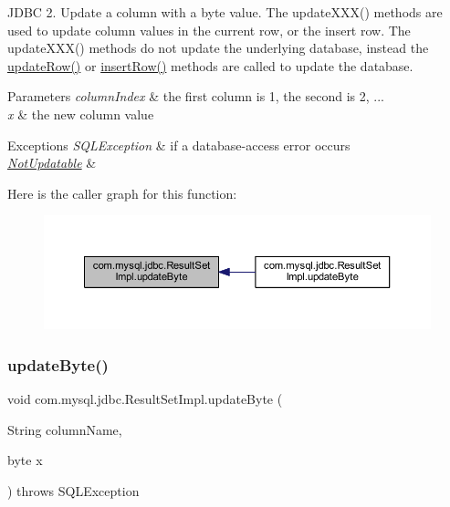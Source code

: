 J\+D\+BC 2. Update a column with a byte value. The update\+X\+X\+X() methods are used to update column values in the current row, or the insert row. The update\+X\+X\+X() methods do not update the underlying database, instead the \mbox{\hyperlink{classcom_1_1mysql_1_1jdbc_1_1_result_set_impl_a2842d32292d023aaeeafedeed3322981}{update\+Row()}} or \mbox{\hyperlink{classcom_1_1mysql_1_1jdbc_1_1_result_set_impl_a78e304e3279cbcf60392f18c1385e3bf}{insert\+Row()}} methods are called to update the database.


\begin{DoxyParams}{Parameters}
{\em column\+Index} & the first column is 1, the second is 2, ... \\
\hline
{\em x} & the new column value\\
\hline
\end{DoxyParams}

\begin{DoxyExceptions}{Exceptions}
{\em S\+Q\+L\+Exception} & if a database-\/access error occurs \\
\hline
{\em \mbox{\hyperlink{classcom_1_1mysql_1_1jdbc_1_1_not_updatable}{Not\+Updatable}}} & \\
\hline
\end{DoxyExceptions}
Here is the caller graph for this function\+:
\nopagebreak
\begin{figure}[H]
\begin{center}
\leavevmode
\includegraphics[width=350pt]{classcom_1_1mysql_1_1jdbc_1_1_result_set_impl_a259de718d0b71b68adc144272b315a24_icgraph}
\end{center}
\end{figure}
\mbox{\label{classcom_1_1mysql_1_1jdbc_1_1_result_set_impl_a81493e206e4e56cca567213fe7ae5973}} 
\subsubsection{\texorpdfstring{update\+Byte()}{updateByte()}\hspace{0.1cm}{\footnotesize\ttfamily [2/2]}}
{\footnotesize\ttfamily void com.\+mysql.\+jdbc.\+Result\+Set\+Impl.\+update\+Byte (\begin{DoxyParamCaption}\item[{String}]{column\+Name,  }\item[{byte}]{x }\end{DoxyParamCaption}) throws S\+Q\+L\+Exception}

